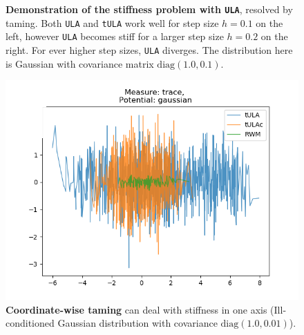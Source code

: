 \begin{figure}[H]
\begin{minipage}[b]{0.49\textwidth}
  \end{minipage}
   \caption{\textbf{Demonstration of the stiffness problem with \texttt{ULA}}, resolved by taming. Both \texttt{ULA} and \texttt{tULA} work well for step size $h = 0.1$ on the left, however \texttt{ULA} becomes stiff for a larger step size $h = 0.2$ on the right. For ever higher step sizes, \texttt{ULA} diverges. The distribution here is Gaussian with covariance matrix $\text{diag}(1.0, 0.1)$.}
\end{figure}

\begin{figure}[H]
\centering
  \begin{minipage}[b]{0.49\textwidth}
  \centering
    \includegraphics[width=\textwidth]{Figures/tula_tulac_rwm_stiff.png}
  \end{minipage} %
   \caption{\textbf{Coordinate-wise taming} can deal with stiffness in one axis (Ill-conditioned Gaussian distribution with covariance $\text{diag}(1.0, 0.01)$).}
\end{figure}



